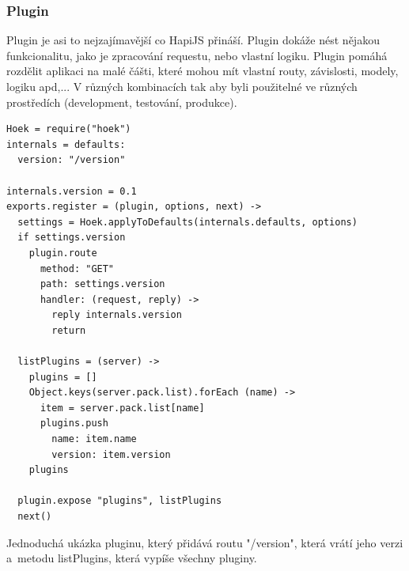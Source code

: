 \documentclass[a4paper,12pt,twoside,BCOR=10mm]{article}
\newenvironment{codeframe}{%
  \begin{Sbox} 
    \begin{minipage} 
      {\columnwidth-\leftmargin-\rightmargin-2\fboxsep-2\fboxrule-4pt} 
}{%

  \end{minipage} 
  \end{Sbox} 
  \begin{center} 
    \fcolorbox{black}{codeback}{\TheSbox} 
  \end{center} 
}
\begin{document}
\subsubsection{Plugin}
Plugin je asi to nejzajímavější co HapiJS přináší. Plugin dokáže nést nějakou funkcionalitu, jako je zpracování requestu, nebo vlastní logiku. Plugin pomáhá rozdělit aplikaci na malé čášti, které mohou mít vlastní routy, závislosti, modely, logiku apd,... V různých kombinacích tak aby byli použitelné ve různých prostředích (development, testování, produkce).\cite{hapiJSDOC}
\begin{codeframe}
  \begin{Verbatim}
Hoek = require("hoek")
internals = defaults:
  version: "/version"

internals.version = 0.1
exports.register = (plugin, options, next) ->
  settings = Hoek.applyToDefaults(internals.defaults, options)
  if settings.version
    plugin.route
      method: "GET"
      path: settings.version
      handler: (request, reply) ->
        reply internals.version
        return

  listPlugins = (server) ->
    plugins = []
    Object.keys(server.pack.list).forEach (name) ->
      item = server.pack.list[name]
      plugins.push
        name: item.name
        version: item.version
    plugins

  plugin.expose "plugins", listPlugins
  next()
\end{Verbatim}
  \end{codeframe}
Jednoduchá ukázka pluginu, který přidává routu "/version", která vrátí jeho verzi a~metodu listPlugins, která vypíše všechny pluginy.
\end{document}
